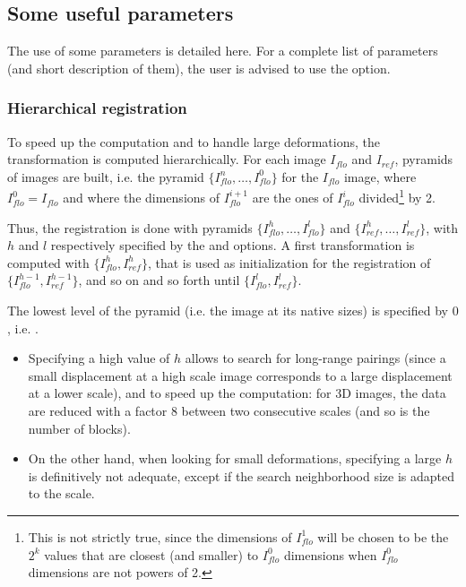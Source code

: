 \subsection{Some useful parameters}

The use of some parameters is detailed here. For a complete list of parameters (and short description of them), the user is advised to use the  option.

\subsubsection{Hierarchical registration}
\label{sec:parameters:hierarchical}

To speed up the computation and to handle large deformations, the transformation is computed hierarchically. For each image 
$I_{flo}$ and $I_{ref}$, pyramids of images are built, i.e. the pyramid $\{I^n_{flo}, \ldots, I^0_{flo}\}$ for the $I_{flo}$ image, where $I^0_{flo} = I_{flo}$ and where the dimensions of $I^{i+1}_{flo}$ are the ones of $I^{i}_{flo}$ divided\footnote{This is not strictly true, since the dimensions of $I^1_{flo}$ will be chosen to be the $2^k$ values that are closest (and smaller) to  $I^0_{flo}$ dimensions when $I^0_{flo}$ dimensions are not powers of 2.} by 2.

Thus, the registration is done with pyramids
$\{I^h_{flo}, \ldots, I^l_{flo}\}$ and $\{I^h_{ref}, \ldots, I^l_{ref}\}$, with $h$ and $l$ respectively specified by the 
 and 
 options. A first transformation is computed with $\{I^h_{flo},I^h_{ref}\}$, that is used as initialization for the registration of  $\{I^{h-1}_{flo},I^{h-1}_{ref}\}$, and so on and so forth until $\{I^l_{flo},I^l_{ref}\}$.

The lowest level of the pyramid (i.e. the image at its native sizes) is specified by $0$, i.e. .

\begin{itemize}
\item Specifying a high value of $h$ allows to search for long-range pairings (since a small displacement at a high scale image corresponds to a large displacement at a lower scale), and to speed up the computation: for 3D images, the data are reduced with a factor 8 between two consecutive scales (and so is the number of blocks).
\item On the other hand, when looking for small deformations, specifying a large $h$ is definitively not adequate, except if the search neighborhood size is adapted to the scale.
\end{itemize}

